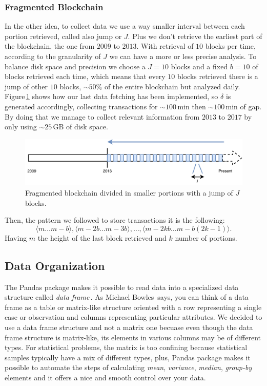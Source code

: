 \documentclass[USenglish]{uit-thesis}
\begin{document}
\subsubsection{Fragmented Blockchain}
In the other idea, to collect data we use a way smaller
interval between each portion
retrieved, called also jump or $J$. Plus
we don't retrieve the earliest part of the
blockchain, the one from $2009$ to $2013$.
With retrieval of $10$ blocks per time,
according to the granularity of $J$ we can
have a more or less precise analysis. To balance
disk space and precision we choose a $J = 10$ blocks
and a fixed $b = 10$ of blocks retrieved each time,
which means that every $10$ blocks retrieved there is
a jump of other $10$ blocks, $\sim$$50\%$ of the entire
blockchain but analyzed daily. Figure\,\ref{fig:portions_new}
shows how our last data fetching has been implemented,
so $\delta$ is generated accordingly, collecting transactions
for $\sim$$100$\,min then $\sim$$100$\,min of gap.
By doing that we manage to collect relevant
information from $2013$ to $2017$ by only
using $\sim$$25$\,GB of disk space.
\begin{figure}[h]
	\centering
	\includegraphics[width=1\textwidth]{img/portions_new}
	\caption{Fragmented blockchain divided in smaller portions with
	a jump of $J$ blocks.}
	\label{fig:portions_new}
\end{figure}
Then, the pattern we followed to store
transactions it is the following:
\[\langle m \dots m-b\rangle, \langle m-2b \dots m-3b\rangle, \dots , \langle m-2kb \dots m - b(2k-1)\rangle.\]
Having $m$ the height of the last block retrieved and $k$ number
of portions.
\subsection{Data Organization}
\label{sec:dataorganization}
The Pandas package makes it possible
to read data into a specialized data structure
called \emph{data frame}\,\cite{pandas}.
As Michael Bowles\,\cite{bowles2015machine} says,
you can think of a data frame as a table or matrix-like
structure oriented with a row representing a single case
or observation and columns representing particular attributes.
We decided to use a data frame structure and not a
matrix one becuase even though the data frame structure
is matrix-like, its elements in various columns may be of
different types. For statistical problems, the matrix is too
confining because statistical samples typically have a mix
of different types, plus, Pandas package makes it possible
to automate the steps of calculating \emph{mean}, \emph{variance},
\emph{median}, \emph{group-by} elements and it
offers a nice and smooth control over your data. 
\end{document}

